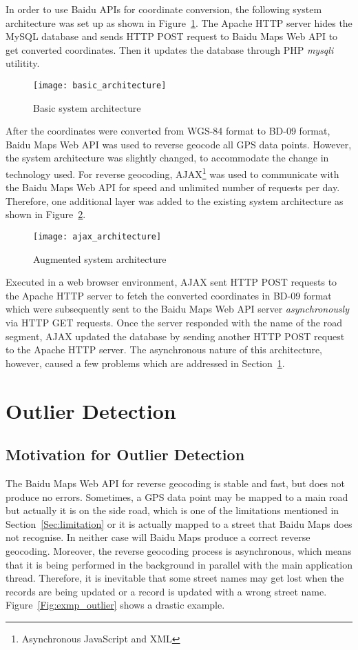 In order to use Baidu APIs for coordinate conversion, the following system architecture was set up as shown in Figure~\ref{Fig:basic_architecture}. The Apache HTTP server hides the MySQL database and sends HTTP POST request to Baidu Maps Web API to get converted coordinates. Then it updates the database through PHP \emph{mysqli} utilitity. 

\begin{figure}[h]
\texttt{[image: basic\_architecture]}
\centering
\caption{Basic system architecture}\label{Fig:basic_architecture}
\end{figure}

After the coordinates were converted from WGS-84 format to BD-09 format, Baidu Maps Web API was used to reverse geocode all GPS data points. However, the system architecture was slightly changed, to accommodate the change in technology used. For reverse geocoding, AJAX\footnote{Asynchronous JavaScript and XML} was used to communicate with the Baidu Maps Web API for speed and unlimited number of requests per day. Therefore, one additional layer was added to the existing system architecture as shown in Figure~\ref{Fig:ajax_architecture}. 

\begin{figure}[h]
\texttt{[image: ajax\_architecture]}
\centering
\caption{Augmented system architecture}\label{Fig:ajax_architecture}
\end{figure}

Executed in a web browser environment, AJAX sent HTTP POST requests to the Apache HTTP server to fetch the converted coordinates in BD-09 format which were subsequently sent to the Baidu Maps Web API server \emph{asynchronously} via HTTP GET requests. Once the server responded with the name of the road segment, AJAX updated the database by sending another HTTP POST request to the Apache HTTP server. The asynchronous nature of this architecture, however, caused a few problems which are addressed in Section~\ref{outlier_detecting}. 

\section{Outlier Detection}\label{outlier_detecting}
\subsection{Motivation for Outlier Detection}
The Baidu Maps Web API for reverse geocoding is stable and fast, but does not produce no errors. Sometimes, a GPS data point may be mapped to a main road but actually it is on the side road, which is one of the limitations mentioned in Section~\ref{Sec:limitation} or it is actually mapped to a street that Baidu Maps does not recognise. In neither case will Baidu Maps produce a correct reverse geocoding. Moreover, the reverse geocoding process is asynchronous, which means that it is being performed in the background in parallel with the main application thread. Therefore, it is inevitable that some street names may get lost when the records are being updated or a record is updated with a wrong street name. Figure~\ref{Fig:exmp_outlier} shows a drastic example.

